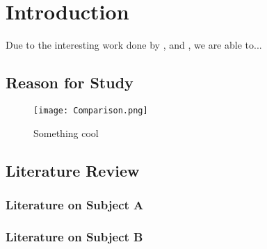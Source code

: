 \chapter{Introduction}
\label{ch:Introduction}

Due to the interesting work done by \cite{ABDELFETTAH20181}, and \cite{SCARLAT20151269}, we are able to...

\section{Reason for Study}

\lipsum[1]

\begin{figure}
    \centering
    \texttt{[image: Comparison.png]}
    \caption{Something cool}
    \label{fig:cool figure}
\end{figure}

\section{Literature Review}

\lipsum[1]

\subsection{Literature on Subject A}

\lipsum[1]

\subsection{Literature on Subject B}
